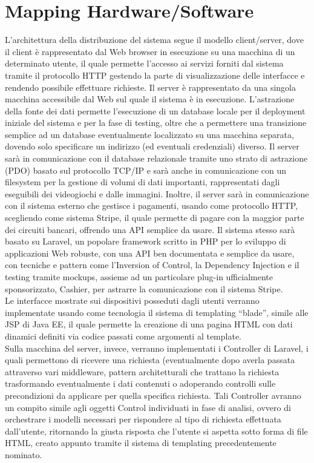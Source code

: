 \section{Mapping Hardware/Software}
L’architettura della distribuzione del sistema segue il modello client/server, dove il client è rappresentato dal Web browser in esecuzione su una macchina di un determinato utente, il quale permette l’accesso ai servizi forniti dal sistema tramite il protocollo HTTP gestendo la parte di visualizzazione delle interfacce e rendendo possibile effettuare richieste. Il server è rappresentato da una singola macchina accessibile dal Web sul quale il sistema è in esecuzione. L’astrazione della fonte dei dati permette l’esecuzione di un database locale per il deployment iniziale del sistema e per la fase di testing, oltre che a permettere una transizione semplice ad un database eventualmente localizzato su una macchina separata, dovendo solo specificare un indirizzo (ed eventuali credenziali) diverso. Il server sarà in comunicazione con il database relazionale tramite uno strato di astrazione (PDO) basato sul protocollo TCP/IP e sarà anche in comunicazione con un filesystem per la gestione di volumi di dati importanti, rappresentati dagli eseguibili dei videogiochi e dalle immagini. Inoltre, il server sarà in comunicazione con il sistema esterno che gestisce i pagamenti, usando come protocollo HTTP, scegliendo come sistema Stripe, il quale permette di pagare con la maggior parte dei circuiti bancari, offrendo una API semplice da usare. Il sistema stesso sarà basato su Laravel, un popolare framework scritto in PHP per lo sviluppo di applicazioni Web robuste, con una API ben documentata e semplice da usare, con tecniche e pattern come l’Inversion of Control, la Dependency Injection e il testing tramite mockups, assieme ad un particolare plug-in ufficialmente sponsorizzato, Cashier, per astrarre la comunicazione con il sistema Stripe. \\
Le interfacce mostrate sui dispositivi posseduti dagli utenti verranno implementate usando come tecnologia il sistema di templating “blade”, simile alle JSP di Java EE, il quale permette la creazione di una pagina HTML con dati dinamici definiti via codice passati come argomenti al template. \\
Sulla macchina del server, invece, verranno implementati i Controller di Laravel, i quali permettono di ricevere una richiesta (eventualmente dopo averla passata attraverso vari middleware, pattern architetturali che trattano la richiesta trasformando eventualmente i dati contenuti o adoperando controlli sulle precondizioni da applicare per quella specifica richiesta. Tali Controller avranno un compito simile agli oggetti Control individuati in fase di analisi, ovvero di orchestrare i modelli necessari per rispondere al tipo di richiesta effettuata dall’utente, ritornando la giusta risposta che l’utente si aspetta sotto forma di file HTML, creato appunto tramite il sistema di templating precedentemente nominato. \\
